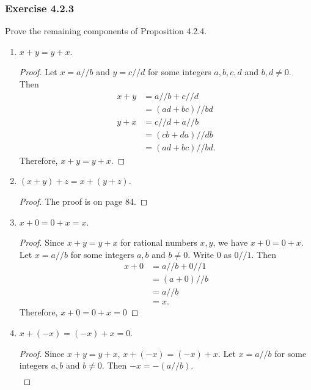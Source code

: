 \documentclass[12pt, letter]{article}
\begin{document}
\subsubsection*{Exercise 4.2.3}
Prove the remaining components of Proposition 4.2.4.
\begin{enumerate}
    \item $x+y=y+x$.
    \begin{proof}
        Let $x=a//b$ and $y=c//d$ for some integers $a,b,c,d$ and $b,d\ne 0$. Then 
        \begin{equation*}
            \begin{aligned}
                x+y&=a//b+c//d\\
                &=(ad+bc)//bd\\
                y+x&=c//d+a//b\\
                &=(cb+da)//db\\
                &=(ad+bc)//bd.
            \end{aligned}
        \end{equation*}
        Therefore, $x+y=y+x$.
    \end{proof}
    \item $(x+y)+z=x+(y+z)$.
    \begin{proof}
        The proof is on page 84.
    \end{proof}
    \item $x+0=0+x=x$.
    \begin{proof}
        Since $x+y=y+x$ for rational numbers $x,y$, we have $x+0=0+x$. Let $x=a//b$ for some integers $a,b$ and $b\ne 0$. Write $0$ as $0//1$. Then 
        \begin{equation*}
            \begin{aligned}
                x+0&=a//b+0//1\\
                &=(a+0)//b\\
                &=a//b\\
                &=x.
            \end{aligned}
        \end{equation*}
        Therefore, $x+0=0+x=0$
    \end{proof}
    \item $x+(-x)=(-x)+x=0$.
    \begin{proof}
        Since $x+y=y+x$, $x+(-x)=(-x)+x$. Let $x=a//b$ for some integers $a,b$ and $b\ne 0$. Then $-x=-(a//b)$.
        \begin{equation*}
            \begin{aligned}

\end{aligned}
\end{equation*}
\end{proof}
\end{enumerate}
\end{document}

